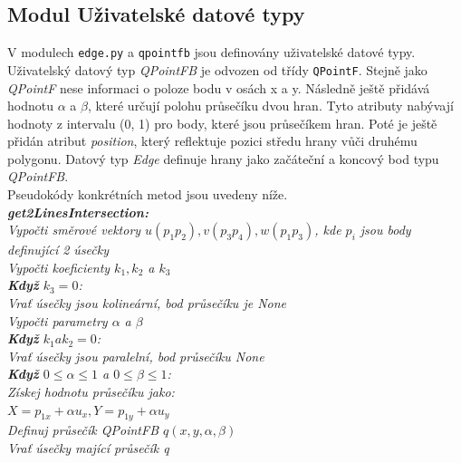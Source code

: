 \documentclass{article}
\begin{document}
\subsection{\small{Modul Uživatelské datové typy}}
V modulech \texttt{edge.py} a \texttt{qpointfb} jsou definovány uživatelské datové typy. Uživatelský datový typ \emph{QPointFB} je odvozen od třídy \texttt{QPointF}. Stejně jako \emph{QPointF} nese informaci o poloze bodu v osách x a y. Následně ještě přidává hodnotu $\alpha$ a $\beta$, které určují polohu průsečíku dvou hran. Tyto atributy nabývají hodnoty z intervalu (0, 1) pro body, které jsou průsečíkem hran. Poté je ještě přidán atribut \emph{position}, který reflektuje pozici středu hrany vůči druhému polygonu. Datový typ \emph{Edge} definuje hrany jako začáteční a koncový bod typu \emph{QPointFB}.\\
Pseudokódy konkrétních metod jsou uvedeny níže.
\vspace{0,2cm}\\
\indent\textit{\textbf{get2LinesIntersection:}}\\
\indent\textit{Vypočti směrové vektory $u(p_{1}p_{2}), v(p_{3}p_{4}), w(p_{1}p_{3})$, kde $p_{i}$ jsou body definující 2 úsečky}\\
\indent\textit{Vypočti koeficienty $k_{1}, k_{2}$ a $k_{3}$}\\
\indent\textit{\textbf{Když} $k_{3} = 0$:}\\
\indent\indent\textit{Vrať úsečky jsou kolineární, bod průsečíku je None}\\
\indent\textit{Vypočti parametry $\alpha$ a $\beta$}\\
\indent\textit{\textbf{Když} $k_{1} a k_{2} = 0$:}\\
\indent\indent\textit{Vrať úsečky jsou paralelní, bod průsečíku None}\\
\indent\textit{\textbf{Když} $0 \leq \alpha \leq 1$ a $0 \leq \beta \leq 1$:}\\
\indent\indent\textit{Získej hodnotu průsečíku jako:}\\
\indent\indent\textit{$X = p_{1x} + \alpha u_{x}, Y = p_{1y} + \alpha u_{y}$}\\
\indent\textit{Definuj průsečík QPointFB $q(x, y, \alpha, \beta)$}\\
\indent\textit{Vrať úsečky mající průsečík q}\\
\vspace{5,8cm}\\
\end{document}
